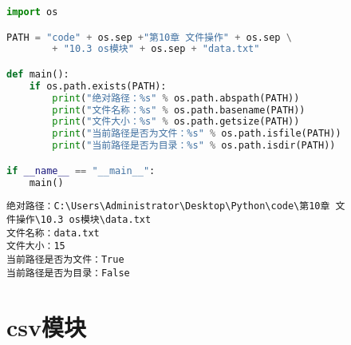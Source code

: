 \begin{table}[H]
	\centering
	\caption{路径分隔符}
\end{table}

\vspace{0.5cm}


\begin{lstlisting}[language=Python]
import os

PATH = "code" + os.sep +"第10章 文件操作" + os.sep \
        + "10.3 os模块" + os.sep + "data.txt"

def main():
    if os.path.exists(PATH):
        print("绝对路径：%s" % os.path.abspath(PATH))
        print("文件名称：%s" % os.path.basename(PATH))
        print("文件大小：%s" % os.path.getsize(PATH))
        print("当前路径是否为文件：%s" % os.path.isfile(PATH))
        print("当前路径是否为目录：%s" % os.path.isdir(PATH))

if __name__ == "__main__":
    main()
\end{lstlisting}

\begin{tcolorbox}
	\begin{verbatim}
绝对路径：C:\Users\Administrator\Desktop\Python\code\第10章 文
件操作\10.3 os模块\data.txt
文件名称：data.txt
文件大小：15
当前路径是否为文件：True
当前路径是否为目录：False
\end{verbatim}
\end{tcolorbox}

\newpage

\section{csv模块}

